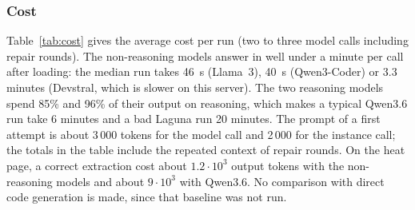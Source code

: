 \subsubsection{Cost}
Table~\ref{tab:cost} gives the average cost per run (two to three model calls including repair rounds). The non-reasoning models answer in well under a minute per call after loading: the median run takes 46~s (Llama~3), 40~s (Qwen3-Coder) or 3.3 minutes (Devstral, which is slower on this server). The two reasoning models spend 85\% and 96\% of their output on reasoning, which makes a typical Qwen3.6 run take 6 minutes and a bad Laguna run 20 minutes. The prompt of a first attempt is about 3\,000 tokens for the model call and 2\,000 for the instance call; the totals in the table include the repeated context of repair rounds. On the heat page, a correct extraction cost about $1.2\cdot10^3$ output tokens with the non-reasoning models and about $9\cdot10^3$ with Qwen3.6. No comparison with direct code generation is made, since that baseline was not run.
\begin{table}[t]
\centering\small
\caption{Mean cost per run (original prompt, 12 runs per model): LLM calls, prompt and output tokens (summed over the calls of a run, including repair rounds), fraction of the output that is reasoning, and wall time per run on the local server.}
\label{tab:cost}

\end{table}




